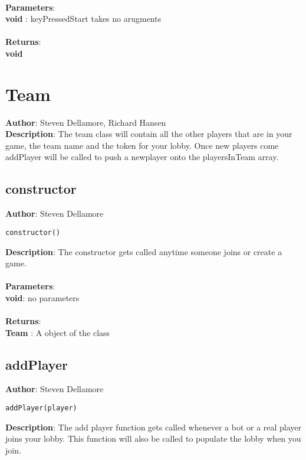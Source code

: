 \documentclass[12pt]{article}
\begin{document}
\textbf{\large{\\Parameters}}:\\
\textbf{void }: keyPressedStart takes no arugments\\\textbf{\large{\\Returns}}:\\\textbf{void}

\section{Team}
\textbf{Author}: Steven Dellamore, Richard Hansen \\
\textbf{Description}: The team class will contain all the other players that are in your game, the team name and the token for your lobby. Once new players come addPlayer will be called to push a newplayer onto the playersInTeam array. \\



\subsection{constructor}
\textbf{Author}: Steven Dellamore 
\vspace*{1\baselineskip}
\begin{lstlisting}
constructor()
\end{lstlisting} 
\vspace*{1\baselineskip}
\textbf{Description}: The constructor gets called anytime someone joins or create a game. \\


\textbf{\large{\\Parameters}}:\\
\textbf{void}: no parameters\\\textbf{\large{\\Returns}}:\\\textbf{Team }: A object of the class

\subsection{addPlayer}
\textbf{Author}: Steven Dellamore 
\vspace*{1\baselineskip}
\begin{lstlisting}
addPlayer(player)
\end{lstlisting} 
\vspace*{1\baselineskip}
\textbf{Description}: The add player function gets called whenever a bot or a real player joins your lobby. This function will also be called to populate the lobby when you join. \\
\end{document}
